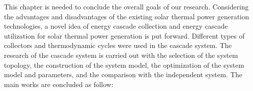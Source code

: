 %
This chapter is needed to conclude the overall goals of our research. Considering the advantages and disadvantages of the existing solar thermal power generation technologies, a novel idea of energy cascade collection and energy cascade utilization for solar thermal power generation is put forward. Different types of collectors and thermodynamic cycles were used in the cascade system. The research of the cascade system is carried out with the selection of the system topology, the construction of the system model, the optimization of the system model and parameters, and the comparison with the independent system. The main works are concluded as follow:

